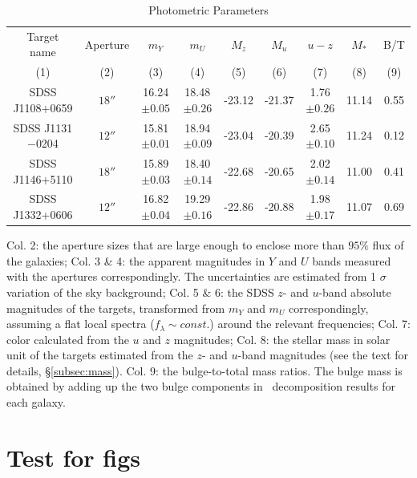 \begin{table}
\caption{Photometric Parameters}
\begin{center}
\begin{tabular}{c c c c c c c c c}
  \hline
  \hline
  Target name     & Aperture & $m_Y$           & $m_U$           & $M_z$  & $M_u$  & $u-z$          & $M_*$ & B/T  \\ 
      (1)         &    (2)   &  (3)            &  (4)            &   (5)  &   (6)  &  (7)           &  (8)  & (9)  \\ \hline
SDSS J1108+0659   & $18''$   & 16.24$\pm 0.05$ & 18.48$\pm 0.26$ & -23.12 & -21.37 & 1.76$\pm 0.26$ & 11.14 & 0.55 \\
SDSS J1131$-$0204 & $12''$   & 15.81$\pm 0.01$ & 18.94$\pm 0.09$ & -23.04 & -20.39 & 2.65$\pm 0.10$ & 11.24 & 0.12 \\
SDSS J1146+5110   & $18''$   & 15.89$\pm 0.03$ & 18.40$\pm 0.14$ & -22.68 & -20.65 & 2.02$\pm 0.14$ & 11.00 & 0.41 \\
SDSS J1332+0606   & $12''$   & 16.82$\pm 0.04$ & 19.29$\pm 0.16$ & -22.86 & -20.88 & 1.98$\pm 0.17$ & 11.07 & 0.69 \\ \hline
\end{tabular}
Col. 2: the aperture sizes that are large enough to enclose more than $95\%$ flux of the galaxies; 
Col. 3 \& 4: the apparent magnitudes in $Y$ and $U$ bands measured with the apertures correspondingly. 
The uncertainties are estimated from 1 $\sigma$ variation of the sky background; 
Col. 5 \& 6: the SDSS $z$- and $u$-band absolute magnitudes of the targets, transformed from $m_Y$ and $m_U$ correspondingly, assuming a flat local spectra ($f_{\lambda} \sim const.$) around the relevant frequencies; 
Col. 7: color calculated from the $u$ and $z$ magnitudes; 
Col. 8: the stellar mass in solar unit of the targets estimated from the $z$- and $u$-band magnitudes (see the text for details, \S \ref{subsec:mass}). 
Col. 9: the bulge-to-total mass ratios. 
The bulge mass is obtained by adding up the two bulge components in \galfit\ decomposition results for each galaxy.                                                         
\end{center}

\label{table:large}
\end{table}%

\newsinglepage

\section{Test for figs}
\label{testforfigs}


